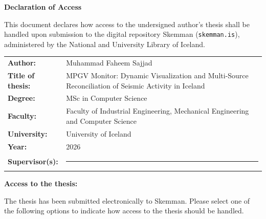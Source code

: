 \documentclass[12pt,a4paper]{article}
\newcommand{\formrule}[1][6cm]{\rule{#1}{0.4pt}}
\begin{document}
\begin{center}
    {\Large\bfseries Declaration of Access}
\end{center}

\vspace{1.5em}

\noindent
This document declares how access to the undersigned author's
thesis shall be handled upon submission to the digital repository
Skemman (\texttt{skemman.is}), administered by the National and
University Library of Iceland.

\vspace{1.8em}

\begin{tabular}{@{}p{4cm} p{10.2cm}@{}}
    \textbf{Author:}              & Muhammad Faheem Sajjad \\[0.8em]
    \textbf{Title of thesis:}     & MPGV Monitor: Dynamic Visualization and
                                    Multi-Source Reconciliation of Seismic
                                    Activity in Iceland \\[0.8em]
    \textbf{Degree:}              & MSc in Computer Science \\[0.8em]
    \textbf{Faculty:}             & Faculty of Industrial Engineering, Mechanical
                                    Engineering and Computer Science \\[0.8em]
    \textbf{University:}          & University of Iceland \\[0.8em]
    \textbf{Year:}                & 2026 \\[0.8em]
    \textbf{Supervisor(s):}       & \formrule[9cm] \\
\end{tabular}

\vspace{1.8em}

\noindent
\textbf{Access to the thesis:}

\vspace{0.3em}

\noindent
The thesis has been submitted electronically to Skemman.
Please select one of the following options to indicate how
access to the thesis should be handled.

\vspace{0.8em}
\end{document}
